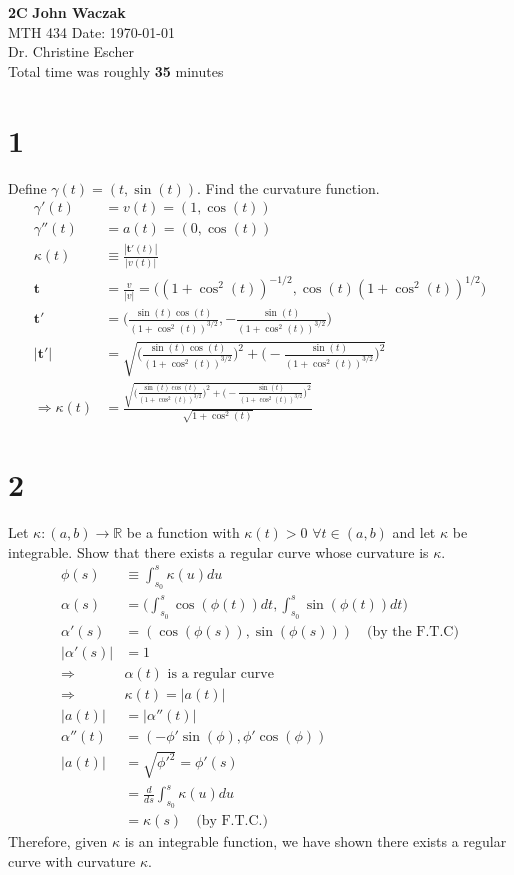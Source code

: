 \documentclass[a4paper, 11pt]{article}
\begin{document}
\noindent
\large\textbf{2C} \hfill \textbf{John Waczak} \\
\normalsize MTH 434 \hfill  Date: \today \\
Dr. Christine Escher \\
Total time was roughly \textbf{35} minutes

\section*{1} Define $\gamma(t) = (t, \sin(t))$. Find the curvature function. 
	\begin{align*}
		\gamma'(t) &= v(t) = (1, \cos(t))\\ 
		\gamma''(t) &= a(t) = (0, \cos(t))\\ 
		\kappa(t) &\equiv \frac{|\mathbf{t}'(t)|}{|v(t)|} \\ 
		\mathbf{t} &= \frac{v}{|v|} = \Big((1+\cos^2(t))^{-1/2}, \cos(t)(1+\cos^2(t))^{1/2}\Big) \\ 
		\mathbf{t}' &= \Big( \frac{\sin(t)\cos(t)}{(1+\cos^2(t))^{3/2}}, -\frac{\sin(t)}{(1+\cos^2(t))^{3/2}} \Big) \\ 
		|\mathbf{t}'| &= \sqrt{\Big(\frac{\sin(t)\cos(t)}{(1+\cos^2(t))^{3/2}}\Big)^2 + \Big(-\frac{\sin(t)}{(1+\cos^2(t))^{3/2}} \Big)^2} \\
		\Rightarrow \kappa(t) &= \frac{\sqrt{\Big(\frac{\sin(t)\cos(t)}{(1+\cos^2(t))^{3/2}}\Big)^2 + \Big(-\frac{\sin(t)}{(1+\cos^2(t))^{3/2}} \Big)^2} }{\sqrt{1+\cos^2(t)}}
	\end{align*} 
	
\section*{2}
Let $\kappa:(a,b)\to \mathbb{R}$ be a function with $\kappa(t) > 0$ $\forall t \in (a,b)$ and let $\kappa$ be integrable. Show that there exists a regular curve whose curvature is $\kappa$. 
	\begin{align*}
		\phi(s) &\equiv \int_{s_0}^s \kappa(u)du \\ 
		\alpha(s) &= \Big(\int_{s_0}^s \cos(\phi(t))dt, \int_{s_0}^s \sin(\phi(t))dt\Big) \\ 
		\alpha'(s) &= (\cos(\phi(s)), \sin(\phi(s))) \quad \text{(by the F.T.C)} \\ 
		|\alpha'(s)| &= 1 \\ 
		\Rightarrow &\alpha(t) \text{ is a regular curve} \\ 
		\Rightarrow &\kappa(t) = |a(t)| \\ 
		|a(t)| &= |\alpha''(t)| \\ 
		\alpha''(t) &= (-\phi'\sin(\phi), \phi'\cos(\phi)) \\ 
		|a(t)| &= \sqrt{\phi'^2} = \phi'(s)\\ 
			&= \frac{d}{ds}\int_{s_0}^{s}\kappa(u)du \\ 
			&= \kappa(s) \quad \text{(by F.T.C.)}
	\end{align*}
Therefore, given $\kappa$ is an integrable function, we have shown there exists a regular curve with curvature $\kappa$. 
\end{document}
